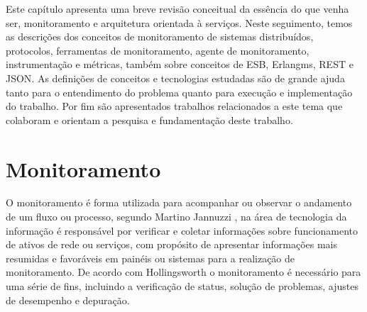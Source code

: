 \label{fundamentacao_teorica}


\newcommand{\texCommand}[1]{\texttt{\textbackslash{#1}}}%

\newcommand{\exemplo}[1]{%
\vspace{\baselineskip}%
\noindent\fbox{\begin{minipage}{\textwidth}#1\end{minipage}}%
\\\vspace{\baselineskip}}%

\newcommand{\exemploVerbatim}[1]{%
\vspace{\baselineskip}%
\noindent\fbox{\begin{minipage}{\textwidth}%
#1\end{minipage}}%
\\\vspace{\baselineskip}}%


Este capítulo apresenta uma breve revisão conceitual da essência do que venha ser, monitoramento e arquitetura orientada à serviços. Neste seguimento, temos as descrições dos conceitos de monitoramento de sistemas distribuídos, protocolos, ferramentas de monitoramento, agente de monitoramento, instrumentação e métricas, também sobre conceitos de \acrshort{ESB}, Erlangms, \acrshort{REST} e \acrshort{JSON}. As definições de conceitos e tecnologias estudadas são de grande ajuda tanto para o entendimento do problema quanto para execução e implementação do trabalho. Por fim são apresentados trabalhos relacionados a este tema que colaboram e orientam a pesquisa e fundamentação deste trabalho.


\section{Monitoramento}

O monitoramento é forma utilizada para acompanhar ou observar o andamento de um fluxo ou processo, segundo Martino Jannuzzi \cite{de2014indicadores}, na área de tecnologia da informação é responsável por verificar e coletar informações sobre funcionamento de ativos de rede ou serviços, com propósito de apresentar informações mais resumidas e favoráveis em painéis ou sistemas para a realização de monitoramento. De acordo com Hollingsworth \cite{hollingsworth2003instrumentation} o monitoramento é necessário para uma série de fins, incluindo a verificação de status, solução de problemas, ajustes de desempenho e depuração. 

